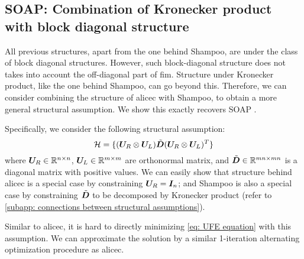 \subsection{SOAP: Combination of Kronecker product with block diagonal structure}
\label{subsec: new opt combination}
All previous structures, apart from the one behind Shampoo, are under the class of block diagonal structures. However, such block-diagonal structure does not takes into account the off-diagonal part of \gls{fim}. Structure under Kronecker product, like the one behind Shampoo, can go beyond this. Therefore, we can consider combining the structure of \gls{alicec} with Shampoo, to obtain a more general structural assumption. We show this exactly recovers SOAP \citep{vyas2024soap}.

Specifically, we consider the following structural assumption: 
\begin{equation}
    \mathcal{H} = \{({\bm{U}}_R\otimes {\bm{U}}_L)\tilde{{\bm{D}}}({\bm{U}}_R\otimes {\bm{U}}_L)^T\}
    \label{eq: SOAP structure}
\end{equation}
where ${\bm{U}}_R\in\mathbb{R}^{n\times n}$, ${\bm{U}}_L\in\mathbb{R}^{m\times m}$ are orthonormal matrix, and $\tilde{{\bm{D}}}\in\mathbb{R}^{mn\times mn}$ is a diagonal matrix with positive values. We can easily show that structure behind \gls{alicec} is a special case by constraining ${\bm{U}}_R={\bm{I}}_n$; and Shampoo is also a special case by constraining $\tilde{{\bm{D}}}$ to be decomposed by Kronecker product (refer to \cref{subapp: connections between structural assumptions}). 

Similar to \gls{alicec}, it is hard to directly minimizing \cref{eq: UFE equation} with this assumption. We can approximate the solution by a similar 1-iteration alternating optimization procedure as \gls{alicec}. 


